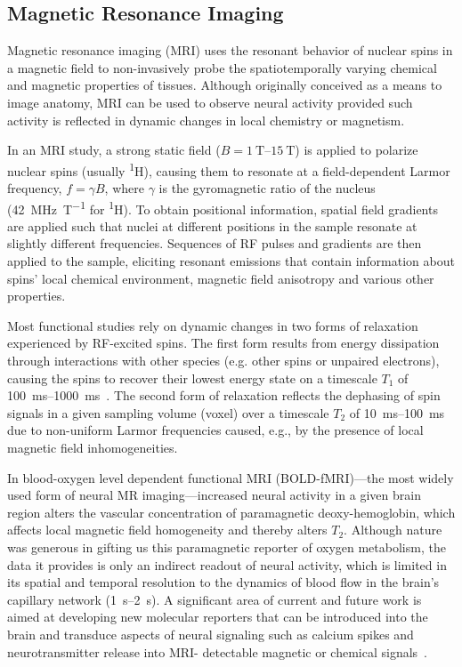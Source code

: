 \subsection{Magnetic Resonance Imaging}

Magnetic resonance imaging (MRI) uses the resonant behavior of nuclear spins in a magnetic field to non-invasively probe the spatiotemporally varying chemical and magnetic properties of tissues.
Although originally conceived as a means to image anatomy, MRI can be used to observe neural activity provided such activity is reflected in dynamic changes in local chemistry or magnetism.

In an MRI study, a strong static field ($B = \SIrange{1}{15}{\tesla}$) is applied to polarize nuclear spins (usually \textsuperscript{1}H), causing them to resonate at a field-dependent Larmor frequency, $f=\gamma B$, where $\gamma$ is the gyromagnetic ratio of the nucleus (\SI{42}{\MHz\per\tesla} for \textsuperscript{1}H). %
To obtain positional information, spatial field gradients are applied such that nuclei at different positions in the sample resonate at slightly different frequencies.
Sequences of RF pulses and gradients are then applied to the sample, eliciting resonant emissions that contain information about spins' local chemical environment, magnetic field anisotropy and various other properties.

Most functional studies rely on dynamic changes in two forms of relaxation experienced by RF-excited spins.
The first form results from energy dissipation through interactions with other species (e.g. other spins or unpaired electrons), causing the spins to recover their lowest energy state on a timescale $T_1$ of \SIrange{100}{1000}{\milli\second}~\cite{rooney07}.
The second form of relaxation reflects the dephasing of spin signals in a given sampling volume (voxel) over a timescale $T_2$ of \SIrange{10}{100}{\milli\second}~\cite{deichmann95} due to non-uniform Larmor frequencies caused, e.g., by the presence of local magnetic field inhomogeneities.

In blood-oxygen level dependent functional MRI (BOLD-fMRI)---the most widely used form of neural MR imaging---increased neural activity in a given brain region alters the vascular concentration of paramagnetic deoxy-hemoglobin, which affects local magnetic field homogeneity and thereby alters $T_2$.
Although nature was generous in gifting us this paramagnetic reporter of oxygen metabolism, the data it provides is only an indirect readout of neural activity, which is limited in its spatial and temporal resolution to the dynamics of blood flow in the brain's capillary network (\SIrange{1}{2}{\second}).
A significant area of current and future work is aimed at developing new molecular reporters that can be introduced into the brain and transduce aspects of neural signaling such as calcium spikes and neurotransmitter release into MRI- detectable magnetic or chemical signals~\cite{shapiro10,koretsky12,hsieh12}.

